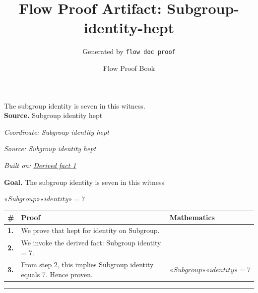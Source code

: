 \documentclass[11pt]{article}
\title{Flow Proof Artifact: Subgroup-identity-hept}
\author{Generated by \texttt{flow doc proof}}
\date{Flow Proof Book}
\theoremstyle{definition}
\begin{document}
\maketitle
The subgroup identity is seven in this witness.\\[0.5em]
\textbf{Source.} Subgroup identity hept\\[0.5em]
\bigskip
{}\par
\smallskip\noindent\textit{Coordinate: Subgroup \cdot identity \cdot hept}\par
\smallskip\noindent\textit{Source: Subgroup identity hept}\par
\smallskip\noindent\textit{Built on: \hyperref[thm:Subgroup-identity-hept]{Derived fact 1}}\par
\medskip
\noindent\textbf{Goal.} The subgroup identity is seven in this witness\par
\noindent$\displaystyle «Subgroup» «identity» = 7$\par
\medskip
\noindent
\begin{tabular}{@{} >{\raggedright\arraybackslash}p{} >{\raggedright\arraybackslash}p{} >{\raggedleft\arraybackslash}p{} @{}}
\textbf{\#} & \textbf{Proof} & \textbf{Mathematics} \\
\midrule
\textbf{1.} & We prove that hept for identity on Subgroup. & \\[0.45em]
\textbf{2.} & We invoke the derived fact: \guillemotleft{}Subgroup\guillemotright{} \guillemotleft{}identity\guillemotright{} = 7. & \\[0.45em]
\textbf{3.} & From step 2, this implies \guillemotleft{}Subgroup\guillemotright{} \guillemotleft{}identity\guillemotright{} equals 7. Hence proven. & $\displaystyle «Subgroup» «identity» = 7$ \\[0.45em]
\bottomrule
\end{tabular}
\label{thm:Subgroup-identity-hept}
\par\medskip\hrule
\end{document}
